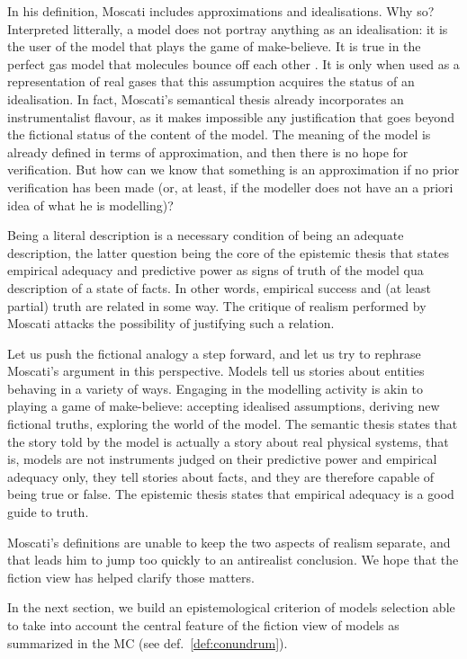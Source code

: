 \documentclass[a4paper,11pt]{article}
\theoremstyle{definition}
\begin{document}
In his definition, Moscati includes approximations and idealisations. Why so? Interpreted litterally, a model does not portray anything as an idealisation: it is the user of the model that plays the game of make-believe. It is true in the perfect gas model that molecules bounce off each other  {\color{red}{(mm problème de cohérence ici)}}. It is only when used as a representation of real gases that this assumption acquires the status of an idealisation. In fact, Moscati's semantical thesis already incorporates an instrumentalist flavour, as it makes impossible any justification that goes beyond the fictional status of the content of the model. The meaning of the model is already defined in terms of approximation, and then there is no hope for verification. But how can we know that something is an approximation if no prior verification has been made (or, at least, if the modeller does not have an a priori idea of what he is modelling)?  

Being a literal description is a necessary condition of being an adequate description, the latter question being the core of the epistemic thesis that states empirical adequacy and predictive power as signs of truth of the model qua description of a state of facts. In other words, empirical success and (at least partial) truth are related in some way. The critique of realism performed by Moscati attacks the possibility of justifying such a relation.

Let us push the fictional analogy a step forward, and let us try to rephrase Moscati's argument in this perspective. Models tell us stories about entities behaving in a variety of ways. Engaging in the modelling activity is akin to playing a game of make-believe: accepting idealised assumptions, deriving new fictional truths, exploring the world of the model. The semantic thesis states that the story told by the model is actually a story about real physical systems, that is, models are not instruments judged on their predictive power and empirical adequacy only, they tell stories about facts, and they are therefore capable of being true or false. The epistemic thesis states that empirical adequacy is a good guide to truth.

Moscati's definitions are unable to keep the two aspects of realism separate, and that leads him to jump too quickly to an antirealist conclusion. We hope that the fiction view has helped clarify those matters.

In the next section, we build an epistemological criterion of models selection able to take into account the central feature of the fiction view of models as summarized in the MC (see def.~\ref{def:conundrum}). 
\end{document}
